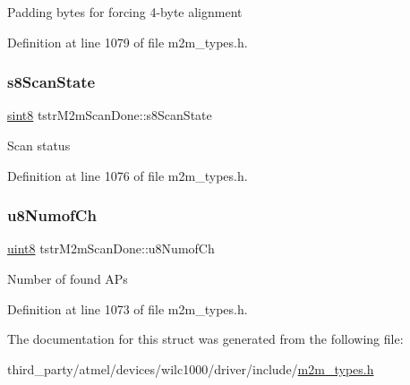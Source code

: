 Padding bytes for forcing 4-\/byte alignment 

Definition at line 1079 of file m2m\+\_\+types.\+h.

\mbox{\label{structtstrM2mScanDone_adf06f5d0db8d0fb98e7674672ee8439d}} 
\subsubsection{\texorpdfstring{s8\+Scan\+State}{s8ScanState}}
{\footnotesize\ttfamily \hyperlink{group__DataT_gae35f10ffd0ac8dd2bc3e794da9bdfbc7}{sint8} tstr\+M2m\+Scan\+Done\+::s8\+Scan\+State}

Scan status 

Definition at line 1076 of file m2m\+\_\+types.\+h.

\mbox{\label{structtstrM2mScanDone_a1303b806dd93bfdd4b4a51ad750b023b}} 
\subsubsection{\texorpdfstring{u8\+Numof\+Ch}{u8NumofCh}}
{\footnotesize\ttfamily \hyperlink{group__DataT_ga4df709a77647e870bbf1d955b8edc9a6}{uint8} tstr\+M2m\+Scan\+Done\+::u8\+Numof\+Ch}

Number of found A\+Ps 

Definition at line 1073 of file m2m\+\_\+types.\+h.



The documentation for this struct was generated from the following file\+:\begin{DoxyCompactItemize}
\item 
third\+\_\+party/atmel/devices/wilc1000/driver/include/\hyperlink{m2m__types_8h}{m2m\+\_\+types.\+h}\end{DoxyCompactItemize}
